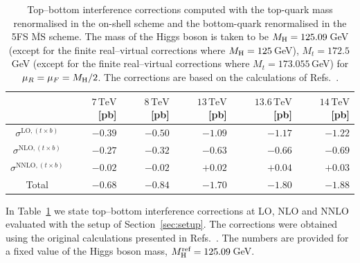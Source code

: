 \begin{table}[h!]
\centering
\begin{tabular}{|c|r|r|r|r|r|}
\hline
& $7\,\mathrm{TeV}$ [pb] & $8\,\mathrm{TeV}$ [pb] & $13\,\mathrm{TeV}$ [pb] & $13.6\,\mathrm{TeV}$ [pb] & $14\,\mathrm{TeV}$ [pb] \\ \hline
$\sigma^{\mathrm{LO}, (t \times b)}$   & $-0.39$                  & $-0.50$                   & $-1.09$                    & $-1.17$                      & $-1.22$                    \\
$\sigma^{\mathrm{NLO}, (t \times b)}$  & $-0.27$                  & $-0.32$                   & $-0.63$                    & $-0.66$                      & $-0.69$                   \\
$\sigma^{\mathrm{NNLO}, (t \times b)}$ & $-0.02$                   & $-0.02$                    & $+0.02$                    & $+0.04$                      & $+0.03$                    \\ \hline 
Total & $-0.68$ & $-0.84$ & $-1.70$ & $-1.80$ & $-1.88$ \\
\hline
\end{tabular}
\caption{
Top--bottom interference corrections computed with the top-quark mass renormalised in the on-shell scheme and the bottom-quark renormalised in the 5FS $\overline{\mathrm{MS}}$ scheme.
The mass of the Higgs boson is taken to be $M_\mathrm{H}=125.09$\,GeV (except for the finite real--virtual corrections where $M_\mathrm{H}=125$\,GeV), $M_t=172.5$\,GeV (except for the finite real--virtual corrections where $M_t = 173.055$\,GeV) for $\mu_R = \mu_F = M_\mathrm{H}/2$. 
The corrections are based on the calculations of Refs.~\cite{Czakon:2023kqm,Czakon:2024ywb}.
}
\label{tab:ggf_mbmtcorr}
\end{table}

In Table~\ref{tab:ggf_mbmtcorr} we state top--bottom interference corrections at LO, NLO and NNLO evaluated with the setup of Section~\ref{sec:setup}.
The corrections were obtained using the original calculations presented in Refs.~\cite{Czakon:2023kqm,Czakon:2024ywb}.
The numbers are provided for a fixed value of the Higgs boson mass, $M_\mathrm{H}^\text{ref}=125.09$\,GeV.

